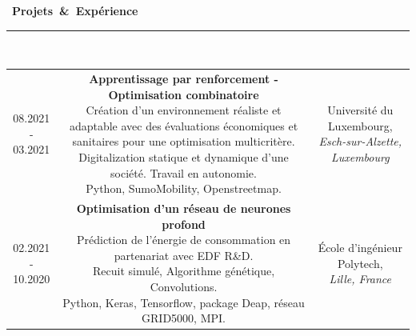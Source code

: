\documentclass[a4paper]{article}
\begin{document}
\begin{titlepage}
\selectfont

\mbox{\Large \comfortaa \textbf{ \faHandshake \hspace{0.2cm} Projets \& Exp\'{e}rience}}\\
\rule{0.8\linewidth}{0.01mm}\\[0.2cm]
\begin{tabular}{ccc}
\parbox[]{0.08\linewidth}{08.2021 -\\ 03.2021\\} 
&
\parbox[]{0.62\linewidth}{\textbf{\large Apprentissage par renforcement - Optimisation combinatoire}\\
Cr\'{e}ation d'un environnement r\'{e}aliste et adaptable avec des \'{e}valuations \'{e}conomiques et sanitaires pour une optimisation multicrit\`{e}re.\\
Digitalization statique et dynamique d'une soci\'{e}t\'{e}. Travail en autonomie.\\
Python, SumoMobility, Openstreetmap.\\}
&
\parbox[]{0.3\linewidth}{Universit\'{e} du Luxembourg,\\
\textit{Esch-sur-Alzette, Luxembourg}\\}

\\

\parbox[]{0.08\linewidth}{02.2021 -\\ 10.2020\\} 
&
\parbox[]{0.62\linewidth}{\textbf{\large 
Optimisation d'un r\'{e}seau de neurones profond}\\
Pr\'{e}diction de l'\'{e}nergie de consommation en partenariat avec EDF R\&D.\\
Recuit simul\'{e}, Algorithme g\'{e}n\'{e}tique, Convolutions.\\
Python, Keras, Tensorflow, package Deap, r\'{e}seau GRID5000, MPI.\\}
&
\parbox[]{0.3\linewidth}{\'{E}cole d'ing\'{e}nieur Polytech,\\ \textit{Lille, France}\\}
\end{tabular}

\medskip


\end{titlepage}
\end{document}
